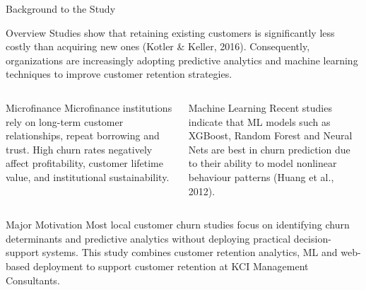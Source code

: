 \documentclass[10pt]{beamer}
\begin{document}
	
	
	\begin{frame}{Background to the Study}
		
		\small
		
		\begin{block}{Overview}
		Studies show that retaining existing customers is significantly less costly than acquiring new ones (Kotler \& Keller, 2016). Consequently, organizations are increasingly adopting predictive analytics and machine learning techniques to improve customer retention strategies.
		\end{block}
		
		\vspace{0.0000002cm}
		
		\begin{columns}
			
			
			\begin{exampleblock}{Microfinance}
				Microfinance institutions rely on long-term customer relationships, repeat borrowing and trust. High churn rates negatively affect profitability, customer lifetime value, and institutional sustainability.
			\end{exampleblock}
			
			
			\begin{exampleblock}{Machine Learning}
				Recent studies indicate that ML models such as XGBoost, Random Forest and Neural Nets are best in churn prediction due to their ability to model nonlinear behaviour patterns (Huang et al., 2012).
			\end{exampleblock}
			
		\end{columns}
		
		\vspace{0.002cm}
		
		

\begin{block}{Major Motivation}
	Most local customer churn studies focus on identifying churn determinants and predictive analytics without deploying practical decision-support systems. This study combines customer retention analytics, ML and web-based deployment to support customer retention at KCI Management Consultants.
\end{block}

	\vspace{0.003cm}
			
	\end{frame}
	
\end{document}
